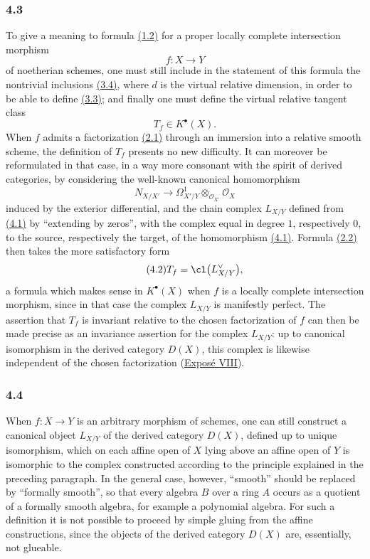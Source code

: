 \subsubsection*{4.3}
To give a meaning to formula \hyperlink{sga6.e00.eq.1-2}{(1.2)} for a proper locally complete intersection morphism
\[
f:X\longrightarrow Y
\]
of noetherian schemes, one must still include in the statement of this formula the nontrivial inclusions \hyperlink{sga6.e00.eq.3-4}{(3.4)}, where $d$ is the virtual relative dimension, in order to be able to define \hyperlink{sga6.e00.sec.3.3}{(3.3)}; and finally one must define the virtual relative tangent class
\[
T_f\in K^\bullet(X).
\]
When $f$ admits a factorization \hyperlink{sga6.e00.eq.2-1}{(2.1)} through an immersion into a relative smooth scheme, the definition of $T_f$ presents no new difficulty. It can moreover be reformulated in that case, in a way more consonant with the spirit of derived categories, by considering the well-known canonical homomorphism
\begin{equation}\tag{4.1}
N_{X/X'}\longrightarrow \Omega^1_{X'/Y}\otimes_{\mathcal O_{X'}}\mathcal O_X
\end{equation}
induced by the exterior differential, and the chain complex $L_{X/Y}$ defined from \hyperlink{sga6.e00.eq.4-1}{(4.1)} by ``extending by zeros'', with the complex equal in degree $1$, respectively $0$, to the source, respectively the target, of the homomorphism \hyperlink{sga6.e00.eq.4-1}{(4.1)}. Formula \hyperlink{sga6.e00.eq.2-2}{(2.2)} then takes the more satisfactory form
\begin{equation}\tag{4.2}
T_f=\cl\bigl(L_{X/Y}^{\vee}\bigr),
\end{equation}
a formula which makes sense in $K^\bullet(X)$ when $f$ is a locally complete intersection morphism, since in that case the complex $L_{X/Y}$ is manifestly perfect. The assertion that $T_f$ is invariant relative to the chosen factorization of $f$ can then be made precise as an invariance assertion for the complex $L_{X/Y}$: up to canonical isomorphism in the derived category $D(X)$, this complex is likewise independent of the chosen factorization (\hyperlink{sga6.e08.expose}{Expos\'e VIII}).

\subsubsection*{4.4}
When $f:X\to Y$ is an arbitrary morphism of schemes, one can still construct a canonical object $L_{X/Y}$ of the derived category $D(X)$, defined up to unique isomorphism, which on each affine open of $X$ lying above an affine open of $Y$ is isomorphic to the complex constructed according to the principle explained in the preceding paragraph. In the general case, however, ``smooth'' should be replaced by ``formally smooth'', so that every algebra $B$ over a ring $A$ occurs as a quotient of a formally smooth algebra, for example a polynomial algebra. For such a definition it is not possible to proceed by simple gluing from the affine constructions, since the objects of the derived category $D(X)$ are, essentially, not glueable.

